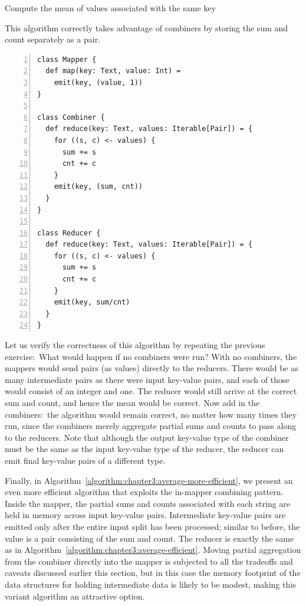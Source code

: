 \begin{algorithm}[t]
\caption{Compute the mean of values associated with the same key}
\label{algorithm:chapter3:average-efficient}
This algorithm correctly takes advantage of combiners by storing the
sum and count separately as a pair.
\begin{small}
\begin{Verbatim}[numbers=left, xleftmargin=7.5mm]
class Mapper {
  def map(key: Text, value: Int) =
    emit(key, (value, 1))
}

class Combiner {
  def reduce(key: Text, values: Iterable[Pair]) = {
    for ((s, c) <- values) {
      sum += s
      cnt += c
    }
    emit(key, (sum, cnt))
  }
}

class Reducer {
  def reduce(key: Text, values: Iterable[Pair]) = {
    for ((s, c) <- values) {
      sum += s
      cnt += c
    }
    emit(key, sum/cnt)
  }
}
\end{Verbatim}
\end{small}
\end{algorithm}

Let us verify the correctness of this algorithm by repeating the
previous exercise:\ What would happen if no combiners were run?  With
no combiners, the mappers would send pairs (as values) directly to the
reducers.  There would be as many intermediate pairs as there were
input key-value pairs, and each of those would consist of an integer
and one.  The reducer would still arrive at the correct sum and count,
and hence the mean would be correct.  Now add in the combiners:\ the
algorithm would remain correct, no matter how many times they run,
since the combiners merely aggregate partial sums and counts to pass
along to the reducers.  Note that although the output key-value type
of the combiner must be the same as the input key-value type of the
reducer, the reducer can emit final key-value pairs of a different
type.

Finally, in Algorithm~\ref{algorithm:chapter3:average-more-efficient}, we
present an even more efficient algorithm that exploits the in-mapper
combining pattern.  Inside the mapper, the partial sums and counts
associated with each string are held in memory across input key-value
pairs.  Intermediate key-value pairs are emitted only after the entire
input split has been processed; similar to before, the value is a pair
consisting of the sum and count.  The reducer is exactly the same as
in Algorithm~\ref{algorithm:chapter3:average-efficient}.  Moving partial
aggregation from the combiner directly into the mapper is subjected to
all the tradeoffs and caveats discussed earlier this section, but in
this case the memory footprint of the data structures for holding
intermediate data is likely to be modest, making this variant
algorithm an attractive option.

